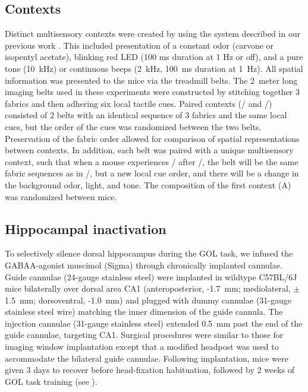\subsection{Contexts}\label{sec:df:methods:contexts}
Distinct multisensory contexts were created by using the system described in our previous work \citep{Lovett-Barron2014}. This included presentation of a constant odor (carvone or isopentyl acetate), blinking red LED (100 ms duration at 1 Hz or off), and a pure tone (10~kHz) or continuous beeps (2~kHz, 100~ms duration at 1~Hz). All spatial information was presented to the mice via the treadmill belts. The 2~meter long imaging belts used in these experiments were constructed by stitching together 3 fabrics and then adhering six local tactile cues. Paired contexts (\A/ and \Aprime/) consisted of 2 belts with an identical sequence of 3 fabrics and the same local cues, but the order of the cues was randomized between the two belts. Preservation of the fabric order allowed for comparison of spatial representations between contexts. In addition, each belt was paired with a unique multisensory context, such that when a mouse experiences \Aprime/ after \A/, the belt will be the same fabric sequences as in \A/, but a new local cue order, and there will be a change in the background odor, light, and tone. The composition of the first context (A) was randomized between mice.
\subsection{Hippocampal inactivation}
To selectively silence dorsal hippocampus during the GOL task, we infused the GABAA-agonist muscimol (Sigma) through chronically implanted cannulae. Guide cannulae (24-gauge stainless steel) were implanted in wildtype C57BL/6J mice bilaterally over dorsal area CA1 (anteroposterior, -1.7~mm; mediolateral, $\pm$1.5~mm; dorsoventral, -1.0~mm) and plugged with dummy cannulae (31-gauge stainless steel wire) matching the inner dimension of the guide cannula. The injection cannulae (31-gauge stainless steel) extended 0.5~mm past the end of the guide cannulae, targeting CA1. Surgical procedures were similar to those for imaging window implantation except that a modified headpost was used to accommodate the bilateral guide cannulae. Following implantation, mice were given 3 days to recover before head-fixation habituation, followed by 2 weeks of GOL task training (see ).

